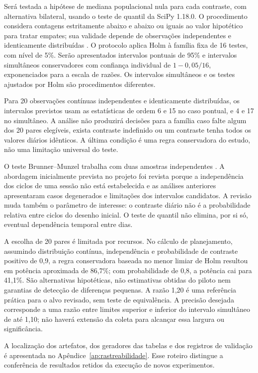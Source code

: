 Será testada a hipótese de mediana populacional nula para cada contraste, com alternativa bilateral, usando o teste de quantil da SciPy 1.18.0. O procedimento considera contagens estritamente abaixo e abaixo ou iguais ao valor hipotético para tratar empates; sua validade depende de observações independentes e identicamente distribuídas \cite{scipyquantile}. O protocolo aplica Holm à família fixa de 16 testes, com nível de 5\%. Serão apresentados intervalos pontuais de 95\% e intervalos simultâneos conservadores com confiança individual de $1-0{,}05/16$, exponenciados para a escala de razões. Os intervalos simultâneos e os testes ajustados por Holm são procedimentos diferentes.

Para 20 observações contínuas independentes e identicamente distribuídas, os intervalos previstos usam as estatísticas de ordem 6 e 15 no caso pontual, e 4 e 17 no simultâneo. A análise não produzirá decisões para a família caso falte algum dos 20 pares elegíveis, exista contraste indefinido ou um contraste tenha todos os valores diários idênticos. A última condição é uma regra conservadora do estudo, não uma limitação universal do teste.

O teste Brunner--Munzel trabalha com duas amostras independentes \cite{scipybm}. A abordagem inicialmente prevista no projeto foi revista porque a independência dos ciclos de uma sessão não está estabelecida e as análises anteriores apresentaram casos degenerados e limitações dos intervalos candidatos. A revisão muda também o parâmetro de interesse: o contraste diário não é a probabilidade relativa entre ciclos do desenho inicial. O teste de quantil não elimina, por si só, eventual dependência temporal entre dias.

A escolha de 20 pares é limitada por recursos. No cálculo de planejamento, assumindo distribuição contínua, independência e probabilidade de contraste positivo de 0,9, a regra conservadora baseada no menor limiar de Holm resultou em potência aproximada de 86,7\%; com probabilidade de 0,8, a potência cai para 41,1\%. São alternativas hipotéticas, não estimativas obtidas do piloto nem garantias de detecção de diferenças pequenas. A razão 1,20 é uma referência prática para o alvo revisado, sem teste de equivalência. A precisão desejada corresponde a uma razão entre limites superior e inferior do intervalo simultâneo de até 1,10; não haverá extensão da coleta para alcançar essa largura ou significância.

A localização dos artefatos, dos geradores das tabelas e dos registros de validação é apresentada no Apêndice~\ref{ap:rastreabilidade}. Esse roteiro distingue a conferência de resultados retidos da execução de novos experimentos.

